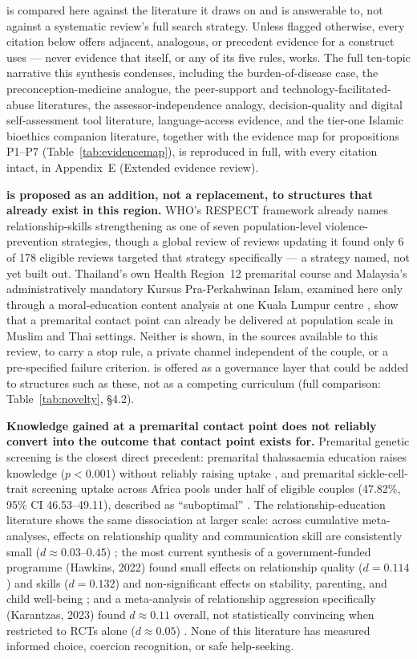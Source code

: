 
\tphe{} is compared here against the literature it draws on and is answerable to, not against a
systematic review's full search strategy. Unless flagged otherwise, every citation below offers
adjacent, analogous, or precedent evidence for a construct \tphe{} uses --- never evidence that
\tphe{} itself, or any of its five rules, works. The full ten-topic narrative this synthesis
condenses, including the burden-of-disease case, the preconception-medicine analogue, the
peer-support and technology-facilitated-abuse literatures, the assessor-independence analogy,
decision-quality and digital self-assessment tool literature, language-access evidence, and the
tier-one Islamic bioethics companion literature, together with the evidence map for propositions
P1--P7 (Table~\ref{tab:evidencemap}), is reproduced in full, with every citation intact, in
Appendix~E (Extended evidence review).

\textbf{\tphe{} is proposed as an addition, not a replacement, to structures that already exist in
this region.} WHO's RESPECT framework already names relationship-skills strengthening as one of
seven population-level violence-prevention strategies, though a global review of reviews updating
it found only 6 of 178 eligible reviews targeted that strategy specifically \cite{who_respect,ref30}
--- a strategy named, not yet built out. Thailand's own Health Region~12 premarital course and
Malaysia's administratively mandatory Kursus Pra-Perkahwinan Islam, examined here only through a
moral-education content analysis at one Kuala Lumpur centre \cite{charoenwong2025}, show that a
premarital contact point can already be delivered at population scale in Muslim and Thai settings.
Neither is shown, in the sources available to this review, to carry a stop rule, a private channel
independent of the couple, or a pre-specified failure criterion. \tphe{} is offered as a governance
layer that could be added to structures such as these, not as a competing curriculum (full
comparison: Table~\ref{tab:novelty}, \S4.2).

\textbf{Knowledge gained at a premarital contact point does not reliably convert into the outcome
that contact point exists for.} Premarital genetic screening is the closest direct precedent:
premarital thalassaemia education raises knowledge ($p<0.001$) without reliably raising uptake
\cite{ref13}, and premarital sickle-cell-trait screening uptake across Africa pools under half of
eligible couples (47.82\%, 95\% CI 46.53--49.11), described as ``suboptimal'' \cite{ref12}. The
relationship-education literature shows the same dissociation at larger scale: across cumulative
meta-analyses, effects on relationship quality and communication skill are consistently small
($d\approx0.03$--$0.45$) \cite{ref6,ref7}; the most current synthesis of a government-funded
programme (Hawkins, 2022) found small effects on relationship quality ($d=0.114$) and skills
($d=0.132$) and non-significant effects on stability, parenting, and child well-being \cite{ref7};
and a meta-analysis of relationship aggression specifically (Karantzas, 2023) found $d\approx0.11$
overall, not statistically convincing when restricted to RCTs alone ($d\approx0.05$) \cite{ref8}.
None of this literature has measured informed choice, coercion recognition, or safe help-seeking.


